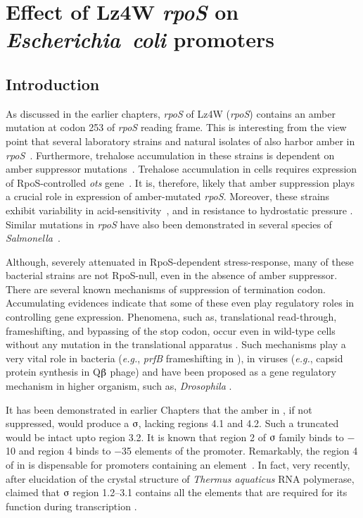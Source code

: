 \chapter{Effect of Lz4W \emph{rpoS} on \mbox{\emph{Escherichia coli}} promoters}

\section{Introduction}
\label{chap5:intro}

As discussed in the earlier chapters, \emph{rpoS} of Lz4W
(\emph{rpoS}) contains an amber mutation at codon 253 of
\emph{rpoS} reading frame. This is interesting from the view point
that several laboratory strains and natural isolates of 
also harbor amber in
\emph{rpoS}~\citep{Jishage1997,Ivanova1992,Visick1997,Atlung2002}.
Furthermore, trehalose accumulation in these strains is dependent
on amber suppressor mutations~\citep{Rod1988}. Trehalose
accumulation in  cells requires expression of
RpoS-controlled \emph{ots} gene~\citep{Hengge1991}. It is,
therefore, likely that amber suppression plays a crucial role in
expression of amber-mutated \emph{rpoS}\@. Moreover, these strains
exhibit variability in acid-sensitivity~\citep{Waterman1996}, and
in resistance to hydrostatic pressure \citep{Robey2001}. Similar
mutations in \emph{rpoS} have also been demonstrated in several
species of \emph{Salmonella}~\citep{Jorgensen2000,Sutton2000}.

Although, severely attenuated in RpoS-dependent stress-response,
many of these bacterial strains are not RpoS-null, even in the
absence of amber suppressor. There are several known mechanisms of
suppression of termination codon. Accumulating evidences indicate
that some of these even play regulatory roles in controlling gene
expression. Phenomena, such as, translational read-through,
frameshifting, and bypassing of the stop codon, occur even in
wild-type cells without any mutation in the translational
apparatus \citep{Hanna1996}. Su\-ch mechanisms play a very vital
role in bacteria (\emph{e.g.}, \emph{prfB} frameshifting in
), in viruses (\emph{e.g.}, capsid protein synthesis in
Q$\betaup$ phage) and have been proposed as a gene regulatory
mechanism in higher organism, such as, \emph{Drosophila}
\citep{Robinson1997}.

It has been demonstrated in earlier Chapters that the amber in
\lzsig{}, if not suppressed, would produce a $\sigmaup$, lacking
regions 4.1 and 4.2. Such a truncated \s{} would be intact upto
region 3.2. It is known that region 2 of $\sigmaup$ family
binds to $-$10 and region 4 binds to $-$35 elements of the
promoter. Remarkably, the region 4 of \siga{} in  is
dispensable for promoters containing an 
element~\citep[,][]{Keilty1987,Kumar1993,Campbell2002}.
In fact, very recently, after elucidation of the crystal structure
of \emph{Thermus aquaticus} RNA polymerase, \citet{Campbell2002}
claimed that $\sigmaup$ region 1.2--3.1 contains all the elements
that are required for its function during transcription .

